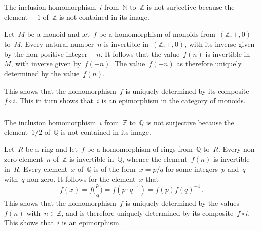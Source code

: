 \subsection{}



\subsubsection{}

The inclusion homomorphism~$i$ from~$ℕ$ to~$ℤ$ is not surjective because the element~$-1$ of~$ℤ$ is not contained in its image.

Let~$M$ be a monoid and let~$f$ be a homomorphism of monoids from~$(ℤ, +, 0)$ to~$M$.
Every natural number~$n$ is invertible in~$(ℤ, +, 0)$, with its inverse given by the non-positive integer~$-n$.
It follows that the value~$f(n)$ is invertible in~$M$, with inverse given by~$f(-n)$.
The value~$f(-n)$ as therefore uniquely determined by the value~$f(n)$.

This shows that the homomorphism~$f$ is uniquely determined by its composite~$f ∘ i$.
This in turn shows that~$i$ is an epimorphism in the category of monoids.



\subsubsection{}

The inclusion homomorphism~$i$ from~$ℤ$ to~$ℚ$ is not surjective because the element~$1 / 2$ of~$ℚ$ is not contained in its image.

Let~$R$ be a ring and let~$f$ be a homomorphism of rings from~$ℚ$ to~$R$.
Every non-zero element~$n$ of~$ℤ$ is invertible in~$ℚ$, whence the element~$f(n)$ is invertible in~$R$.
Every element~$x$ of~$ℚ$ is of the form~$x = p / q$ for some integers~$p$ and~$q$ with~$q$ non-zero.
It follows for the element~$x$ that
\[
	f(x)
	=
	f\biggl( \frac{p}{q} \biggr)
	=
	f( p ⋅ q^{-1} )
	=
	f(p) f(q)^{-1} \,.
\]
This shows that the homomorphism~$f$ is uniquely determined by the values~$f(n)$ with~$n ∈ ℤ$, and is therefore uniquely determined by its composite~$f ∘ i$.
This shows that~$i$ is an epimorphism.

